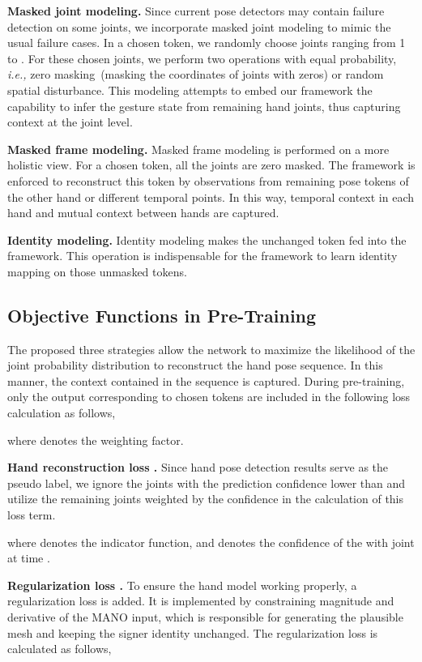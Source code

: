 \documentclass[10pt,twocolumn,letterpaper]{article}
\begin{document}
\noindent \textbf{Masked joint modeling.}
Since current pose detectors may contain failure detection on some joints, we incorporate masked joint modeling to mimic the usual failure cases.
In a chosen token, we randomly choose  joints ranging from 1 to .
For these chosen joints, we perform two operations with equal probability, \emph{i.e.,} zero masking~(masking the coordinates of joints with zeros) or random spatial disturbance.
This modeling attempts to embed our framework the capability to infer the gesture state from remaining hand joints, thus capturing context at the joint level.

\noindent \textbf{Masked frame modeling.}
Masked frame modeling is performed on a more holistic view.
For a chosen token, all the joints are zero masked.
The framework is enforced to reconstruct this token by observations from remaining pose tokens of the other hand or different temporal points.
In this way, temporal context in each hand and mutual context between hands are captured.

\noindent \textbf{Identity modeling.}
Identity modeling makes the unchanged token fed into the framework.
This operation is indispensable for the framework to learn identity mapping on those unmasked tokens.




\subsection{Objective Functions in Pre-Training}
The proposed three strategies allow the network to maximize the likelihood of the joint probability distribution to reconstruct the hand pose sequence.
In this manner, the context contained in the sequence is captured.
During pre-training, only the output corresponding to chosen tokens are included in the following loss calculation as follows,

where  denotes the weighting factor.

\noindent \textbf{Hand reconstruction loss .}
Since hand pose detection results  serve as the pseudo label, we ignore the joints with the prediction confidence lower than  and utilize the remaining joints weighted by the confidence in the calculation of this loss term.

where  denotes the indicator function, and  denotes the confidence of the  with joint  at time .

\noindent \textbf{Regularization loss .}
To ensure the hand model working properly, a regularization loss is added.
It is implemented by constraining magnitude and derivative of the MANO input, which is responsible for generating the plausible mesh and keeping the signer identity unchanged.
The regularization loss is calculated as follows,
\end{document}
